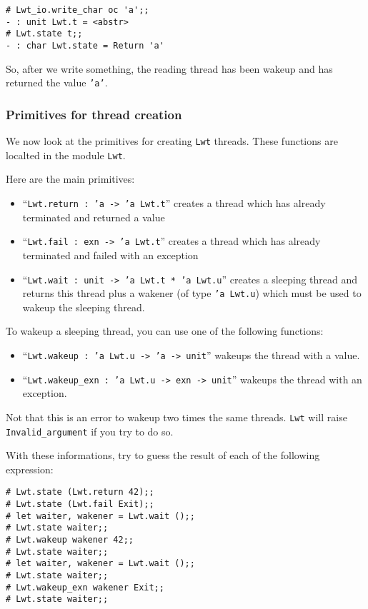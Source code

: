 \documentclass{article}
\newcommand{\lwt}{\texttt{Lwt}\xspace}
\begin{document}
\begin{verbatim}
# Lwt_io.write_char oc 'a';;
- : unit Lwt.t = <abstr>
# Lwt.state t;;
- : char Lwt.state = Return 'a'
\end{verbatim}

So, after we write something, the reading thread has been wakeup and
has returned the value \texttt{'a'}.

\subsubsection{Primitives for thread creation}

We now look at the primitives for creating \lwt threads. These
functions are localted in the module \texttt{Lwt}.

Here are the main primitives:

\begin{itemize}
\item ``\texttt{Lwt.return : 'a -> 'a Lwt.t}'' creates a thread which has already
  terminated and returned a value
\item ``\texttt{Lwt.fail : exn -> 'a Lwt.t}'' creates a thread which has
  already terminated and failed with an exception
\item ``\texttt{Lwt.wait : unit -> 'a Lwt.t * 'a Lwt.u}'' creates a
  sleeping thread and returns this thread plus a wakener (of type
  \texttt{'a Lwt.u}) which must be used to wakeup the sleeping thread.
\end{itemize}

To wakeup a sleeping thread, you can use one of the following
functions:

\begin{itemize}
\item ``\texttt{Lwt.wakeup : 'a Lwt.u -> 'a -> unit}'' wakeups the
  thread with a value.
\item ``\texttt{Lwt.wakeup\_exn : 'a Lwt.u -> exn -> unit}'' wakeups
  the thread with an exception.
\end{itemize}

Not that this is an error to wakeup two times the same threads. \lwt
will raise \texttt{Invalid\_argument} if you try to do so.

With these informations, try to guess the result of each of the
following expression:

\begin{verbatim}
# Lwt.state (Lwt.return 42);;
# Lwt.state (Lwt.fail Exit);;
# let waiter, wakener = Lwt.wait ();;
# Lwt.state waiter;;
# Lwt.wakeup wakener 42;;
# Lwt.state waiter;;
# let waiter, wakener = Lwt.wait ();;
# Lwt.state waiter;;
# Lwt.wakeup_exn wakener Exit;;
# Lwt.state waiter;;
\end{verbatim}
\end{document}
